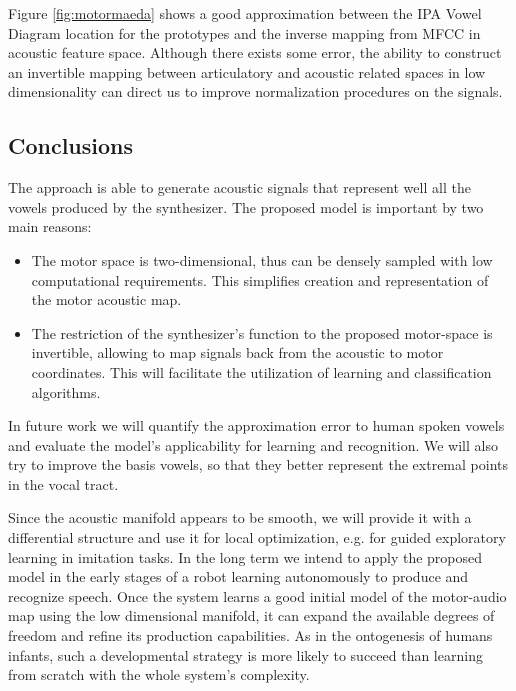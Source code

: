 Figure \ref{fig:motormaeda} shows a good approximation between the IPA
Vowel Diagram location for the prototypes and the inverse mapping from
MFCC in acoustic feature space. Although there exists some error, the
ability to construct an invertible mapping between articulatory and
acoustic related spaces in low dimensionality can direct us to improve
normalization procedures on the signals.

\subsection{Conclusions}
The approach is able to generate acoustic signals that represent well
all the vowels produced by the synthesizer.
The proposed model is important by two main reasons:
\begin{itemize}
\item The motor space is two-dimensional, thus can be densely sampled
  with low computational requirements.
  This simplifies creation and representation of the motor acoustic map.
\item The restriction of the synthesizer's function to the proposed
  motor-space is invertible, allowing to map signals back from the
  acoustic to motor coordinates. This will facilitate the utilization
  of learning and classification algorithms.
\end{itemize}
In future work we will quantify the approximation error to human
spoken vowels and evaluate the model's applicability for learning and
recognition. We will also try to improve the basis vowels, so that
they better represent the extremal points in the vocal tract.

Since the acoustic manifold appears to be smooth, we will provide it
with a differential structure and use it for local optimization,
e.g. for guided exploratory learning in imitation tasks. In the long
term we intend to apply the proposed model in the early stages of a
robot learning autonomously to produce and recognize speech. Once the
system learns a good initial model of the motor-audio map using the
low dimensional manifold, it can expand the available degrees of
freedom and refine its production capabilities. As in the ontogenesis
of humans infants, such a developmental strategy is more likely to
succeed than learning from scratch with the whole system's complexity.



